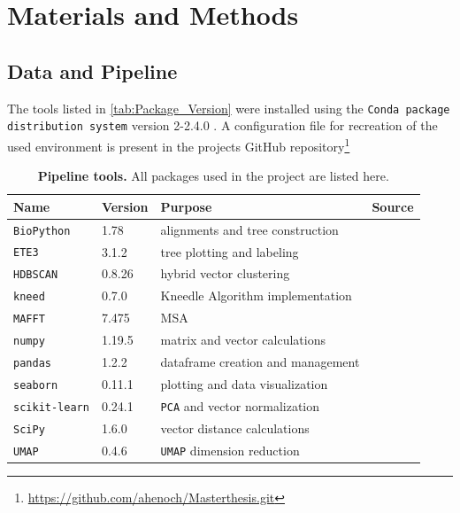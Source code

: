 \chapter{Materials and Methods} \label{chap:Materials_and_Methods}

\section{Data and Pipeline}

The tools listed in \autoref{tab:Package_Version} were installed using the \texttt{Conda package distribution system} version 2-2.4.0 \autocite{anaconda_software_distribution_anaconda_2020}. A configuration file for recreation of the used environment is present in the projects GitHub repository\footnote{\url{https://github.com/ahenoch/Masterthesis.git}}

\begin{table}[hbt]
    \footnotesize
    \centering
    \caption[Pipeline tools]{\textbf{Pipeline tools.} All packages used in the project are listed here.}
    \label{tab:Package_Version}
    \begin{tabular*}{0.75\textwidth}{@{\extracolsep{\fill}\hspace{6pt}}llll}
        \toprule
        \textbf{Name} & \textbf{Version} & \textbf{Purpose} & \textbf{Source}\\
        \midrule
        \texttt{BioPython} & 1.78 & alignments and tree construction & \autocite{cock_biopython_2009}\\
        \texttt{ETE3} & 3.1.2 & tree plotting and labeling & \autocite{huerta-cepas_ete_2016}\\
        \texttt{HDBSCAN} & 0.8.26 & hybrid vector clustering & \autocite{mcinnes_hdbscan_2017}\\
        \texttt{kneed} & 0.7.0 & Kneedle Algorithm implementation & \autocite{satopaa_finding_2011}\\
        \texttt{MAFFT} & 7.475 & \acrlong{MSA} & \autocite{katoh_mafft_2013}\\
        \texttt{numpy} & 1.19.5 & matrix and vector calculations & \autocite{harris_array_2020}\\
        \texttt{pandas} & 1.2.2 & dataframe creation and management & \autocite{mckinney_data_2010}\\
        \texttt{seaborn} & 0.11.1 & plotting and data visualization & \autocite{waskom_seaborn_2021}\\
        \texttt{scikit-learn} & 0.24.1 & \texttt{PCA} and vector normalization & \autocite{pedregosa_scikit-learn_2011}\\
        \texttt{SciPy} & 1.6.0 & vector distance calculations & \autocite{scipy_10_contributors_scipy_2020}\\
        \texttt{UMAP} & 0.4.6 & \texttt{UMAP} dimension reduction & \autocite{mcinnes_umap_2020}\\
        \bottomrule
    \end{tabular*}
\end{table}

